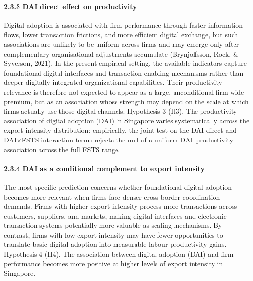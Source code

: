 \documentclass[12pt,a4paper]{article}
\begin{document}
\hypertarget{233-dai-direct-effect-on-productivity}{%
\paragraph{2.3.3 DAI direct effect on
productivity}\label{233-dai-direct-effect-on-productivity}}

Digital adoption is associated with firm performance through faster
information flows, lower transaction frictions, and more efficient
digital exchange, but such associations are unlikely to be uniform
across firms and may emerge only after complementary organisational
adjustments accumulate (Brynjolfsson, Rock, \& Syverson, 2021). In the
present empirical setting, the available indicators capture foundational
digital interfaces and transaction-enabling mechanisms rather than
deeper digitally integrated organizational capabilities. Their
productivity relevance is therefore not expected to appear as a large,
unconditional firm-wide premium, but as an association whose strength
may depend on the scale at which firms actually use those digital
channels. Hypothesis 3 (H3). The productivity association of digital
adoption (DAI) in Singapore varies systematically across the
export-intensity distribution: empirically, the joint test on the DAI
direct and DAI×FSTS interaction terms rejects the null of a uniform
DAI--productivity association across the full FSTS range.

\hypertarget{234-dai-as-a-conditional-complement-to-export-intensity}{%
\paragraph{2.3.4 DAI as a conditional complement to export
intensity}\label{234-dai-as-a-conditional-complement-to-export-intensity}}

The most specific prediction concerns whether foundational digital
adoption becomes more relevant when firms face denser cross-border
coordination demands. Firms with higher export intensity process more
transactions across customers, suppliers, and markets, making digital
interfaces and electronic transaction systems potentially more valuable
as scaling mechanisms. By contrast, firms with low export intensity may
have fewer opportunities to translate basic digital adoption into
measurable labour-productivity gains. Hypothesis 4 (H4). The association
between digital adoption (DAI) and firm performance becomes more
positive at higher levels of export intensity in Singapore.
\end{document}
